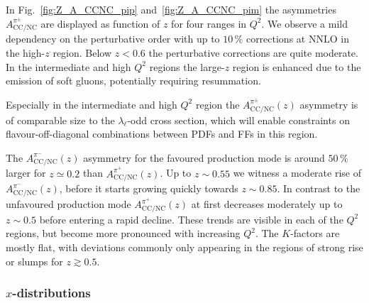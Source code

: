 \documentclass[11pt,a4paper]{article}
\newcommand{\NC}{\mathrm{NC}}
\newcommand{\CC}{\mathrm{CC}}
\begin{document}
In Fig.~\ref{fig:Z_A_CCNC_pip} and~\ref{fig:Z_A_CCNC_pim} the asymmetries $A^{\pi^{\pm}}_\mathrm{CC/NC}$
are displayed
as function of $z$ for four ranges in $Q^2$.
We observe a mild dependency on the perturbative order with up to $10\, \%$ corrections at NNLO in the high-$z$ region.
Below $z<0.6$ the perturbative corrections are quite moderate.
In the intermediate and high $Q^2$ regions the large-$z$ region is enhanced due to the emission of soft gluons, potentially requiring resummation.

Especially in the intermediate and high $Q^2$ region the $A^{\pi^{\pm}}_\mathrm{CC/NC}(z)$ asymmetry is of comparable size to the $\lambda_\ell$-odd cross section, which will enable constraints on flavour-off-diagonal combinations between PDFs and FFs in this region.

The $A_{\CC/\NC}^{\pi^-}(z)$ asymmetry for the favoured production mode is around $50\,\%$ larger for $z\simeq 0.2$ than $A_{\CC/\NC}^{\pi^+}(z)$.
Up to $z\sim 0.55$ we witness a moderate rise of $A_{\CC/\NC}^{\pi^-}(z)$, before it starts growing quickly towards $z\sim 0.85$.
In contrast to the unfavoured production mode $A_{\CC/\NC}^{\pi^+}(z)$ at first decreases moderately up to $z\sim 0.5$ before entering a rapid decline.
These trends are visible in each of the $Q^2$ regions, but become more pronounced with increasing $Q^2$.
The $K$-factors are mostly flat, with deviations commonly only appearing in the regions of strong rise or slumps for $z\gtrsim 0.5$.

\subsubsection[\texorpdfstring{$x$-distributions}{x-distributions}]{\boldmath $x$-distributions}
\end{document}
